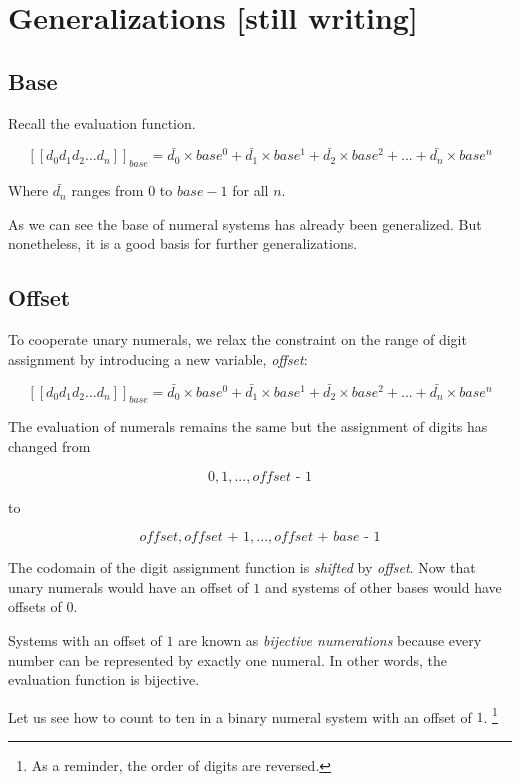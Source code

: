 \documentclass[../thesis.tex]{subfiles}
\begin{document}
\chapter{Generalizations [still writing]}\label{generalizations}


\section{Base}

Recall the evaluation function.

$$
    [\![d_0d_1d_2...d_n]\!]_{base}
    =
    \bar{d_0}\times base^0 + \bar{d_1}\times base^1 + \bar{d_2}\times base^2 + ... + \bar{d_n}\times base^n
$$

Where $ \bar{d_n} $ ranges from $ 0 $ to $ base - 1 $ for all $ n $.

As we can see the base of numeral systems has already been generalized.
But nonetheless, it is a good basis for further generalizations.

\section{Offset}

To cooperate unary numerals, we relax the constraint on the range of digit assignment
by introducing a new variable, \textit{offset}:

$$
    [\![d_0d_1d_2...d_n]\!]_{base}
    =
    \bar{d_0}\times base^0 + \bar{d_1}\times base^1 + \bar{d_2}\times base^2 + ... + \bar{d_n}\times base^n
$$

The evaluation of numerals remains the same but the assignment of digits has changed from

$$
    { 0, 1, ..., \textit{offset - 1} }
$$

to

$$
    { \textit{offset}, \textit{offset + 1}, ..., \textit{offset + base - 1} }
$$

The codomain of the digit assignment function is \textit{shifted} by \textit{offset}.
Now that unary numerals would have an offset of $ 1 $
and systems of other bases would have offsets of $ 0 $.

Systems with an offset of $ 1 $ are known as \textit{bijective numerations}
because every number can be represented by exactly one numeral. In other words,
the evaluation function is bijective.

Let us see how to count to ten in a binary numeral system with an offset of $ 1 $.
\footnote{As a reminder, the order of digits are reversed.}
\end{document}
